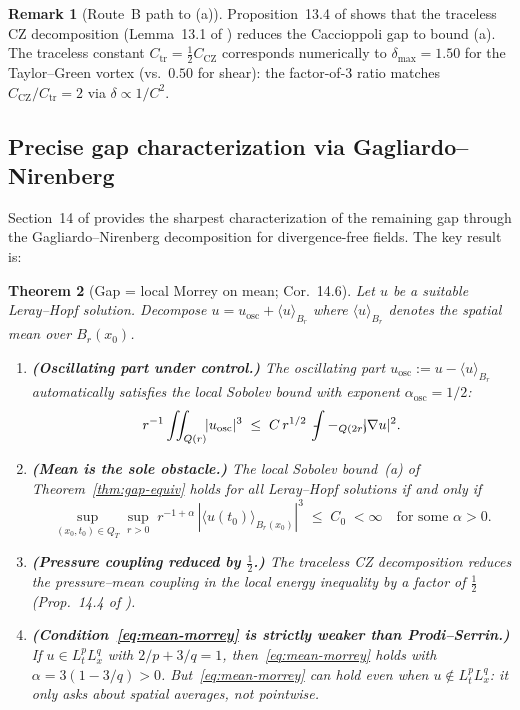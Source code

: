 \documentclass[11pt]{article}
\newtheorem{theorem}{Theorem}[section]
\theoremstyle{definition}
\newtheorem{remark}[theorem]{Remark}
\theoremstyle{remark}
\newcommand{\grad}{\nabla}
\newcommand{\Xint}{\mathop{\,\rlap{-}\!\!\int}\nolimits}
\newcommand{\dlt}{\delta}
\begin{document}
\begin{remark}[Route~B path to (a)]
  Proposition~13.4 of \cite{WorkingProof2026} shows that the traceless CZ
  decomposition (Lemma~13.1 of \cite{WorkingProof2026}) reduces the Caccioppoli
  gap to bound (a).  The traceless constant $C_{\mathrm{tr}}=\tfrac{1}{2}C_{\mathrm{CZ}}$
  corresponds numerically to $\dlt_{\max}=1.50$ for the Taylor--Green vortex
  (vs.\ $0.50$ for shear): the factor-of-3 ratio matches
  $C_{\mathrm{CZ}}/C_{\mathrm{tr}}=2$ via $\dlt\propto 1/C^2$.
\end{remark}

\subsection{Precise gap characterization via Gagliardo--Nirenberg}
\label{sec:gn-gap}

Section~14 of \cite{WorkingProof2026} provides the sharpest characterization
of the remaining gap through the Gagliardo--Nirenberg decomposition for
divergence-free fields.  The key result is:

\begin{theorem}[Gap = local Morrey on mean; \cite{WorkingProof2026} Cor.~14.6]
\label{thm:gn-gap}
  Let $u$ be a suitable Leray--Hopf solution. Decompose
  $u = u_{\mathrm{osc}} + \langle u\rangle_{B_r}$
  where $\langle u\rangle_{B_r}$ denotes the spatial mean over $B_r(x_0)$.
  \begin{enumerate}[label=(\alph*)]
    \item \textbf{(Oscillating part under control.)}
      The oscillating part $u_{\mathrm{osc}}:=u-\langle u\rangle_{B_r}$ automatically satisfies
      the local Sobolev bound with exponent $\alpha_{\mathrm{osc}}=1/2$:
      \[
        r^{-1}\iint_{Q(r)}\!\!|u_{\mathrm{osc}}|^3
        \;\leq\; C\,r^{1/2}\,\Xint-_{Q(2r)}\!\!|\grad u|^2.
      \]
    \item \textbf{(Mean is the sole obstacle.)}
      The local Sobolev bound~(a) of Theorem~\ref{thm:gap-equiv} holds for all
      Leray--Hopf solutions if and only if
      \begin{equation}\label{eq:mean-morrey}
        \sup_{(x_0,t_0)\in Q_T}\sup_{r>0}\;r^{-1+\alpha}\,|\langle u(t_0)\rangle_{B_r(x_0)}|^3
        \;\leq\; C_0 \;<\infty \quad\text{for some }\alpha>0.
      \end{equation}
    \item \textbf{(Pressure coupling reduced by $\tfrac{1}{2}$.)}
      The traceless CZ decomposition reduces the pressure--mean coupling in the
      local energy inequality by a factor of $\tfrac{1}{2}$
      (Prop.~14.4 of \cite{WorkingProof2026}).
    \item \textbf{(Condition~\eqref{eq:mean-morrey} is strictly weaker than Prodi--Serrin.)}
      If $u\in L^p_t L^q_x$ with $2/p+3/q=1$, then~\eqref{eq:mean-morrey} holds
      with $\alpha=3(1-3/q)>0$.  But~\eqref{eq:mean-morrey} can hold even when
      $u\notin L^p_tL^q_x$: it only asks about spatial averages, not pointwise.
  \end{enumerate}
\end{theorem}
\end{document}
